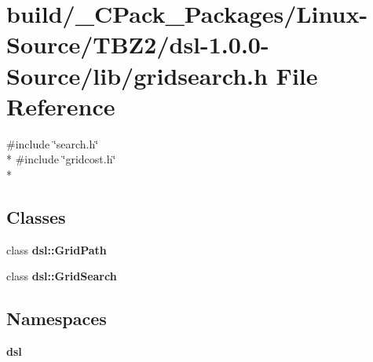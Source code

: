 \section{build/\-\_\-\-C\-Pack\-\_\-\-Packages/\-Linux-\/\-Source/\-T\-B\-Z2/dsl-\/1.0.0-\/\-Source/lib/gridsearch.h File Reference}
\label{build_2__CPack__Packages_2Linux-Source_2TBZ2_2dsl-1_80_80-Source_2lib_2gridsearch_8h}
{\ttfamily \#include \char`\"{}search.\-h\char`\"{}}\\*
{\ttfamily \#include \char`\"{}gridcost.\-h\char`\"{}}\\*
\subsection*{Classes}
\begin{DoxyCompactItemize}
\item 
class {\bf dsl\-::\-Grid\-Path}
\item 
class {\bf dsl\-::\-Grid\-Search}
\end{DoxyCompactItemize}
\subsection*{Namespaces}
\begin{DoxyCompactItemize}
\item 
{\bf dsl}
\end{DoxyCompactItemize}

